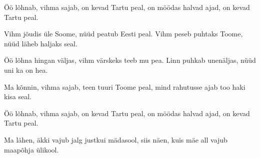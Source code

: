 

\beginverse*
	 Öö lõhnab, vihma sajab, 
on kevad Tartu peal, 
on möödas halvad ajad, 
on kevad Tartu peal. 
\endverse

\beginchorus
Vihm jõudis üle Soome, 
nüüd peatub Eesti peal. 
Vihm peseb puhtaks Toome, 
nüüd läheb haljaks seal. 
\endchorus

\beginverse*
Öö lõhna hingan väljas, 
vihm värskeks teeb mu pea. 
Linn puhkab unenäljas, 
nüüd uni ka on hea. 
\endverse

\beginchorus
Ma kõnnin, vihma sajab, 
teen tuuri Toome peal, 
mind rahutusse ajab 
too haki kisa seal.
\endchorus

\beginverse*
Öö lõhnab, vihma sajab,  
on kevad Tartu peal,
on möödas halvad ajad, 
on kevad Tartu peal. 
\endverse

\beginchorus
Ma lähen, äkki vajub 
jalg justkui mädasool, 
siis näen, kuis mäe all vajub 
maapõhja ülikool.
\endchorus

\endsong
